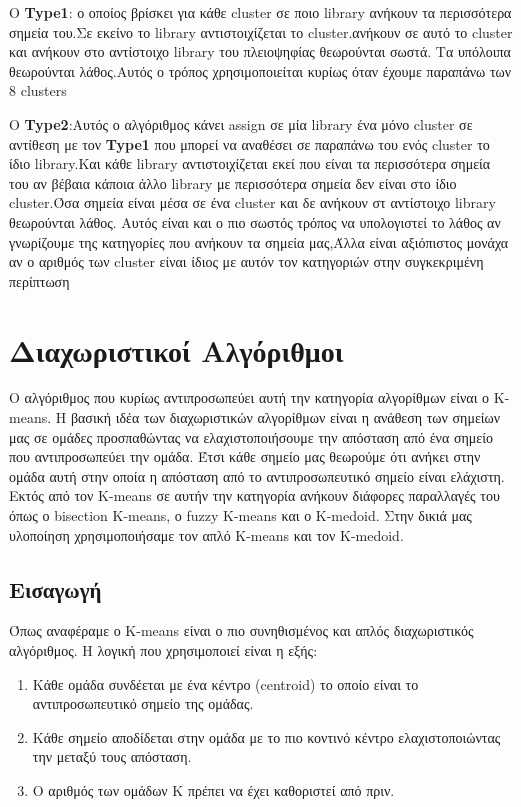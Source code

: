 Ο \textbf{Type1}: ο οποίος βρίσκει για  κάθε cluster σε ποιο
library ανήκουν τα περισσότερα σημεία του.Σε εκείνο το library αντιστοιχίζεται το 
cluster.ανήκουν σε αυτό το cluster και ανήκουν στο αντίστοιχο library του πλειοψηφίας 
θεωρούνται σωστά. Τα υπόλοιπα θεωρούνται λάθος.Αυτός ο τρόπος
χρησιμοποιείται κυρίως όταν έχουμε παραπάνω των 8 clusters 


Ο \textbf{Type2}:Αυτός ο αλγόριθμος κάνει 
assign σε μία library ένα μόνο  cluster σε αντίθεση
με τον \textbf{Type1} που μπορεί να αναθέσει σε παραπάνω του ενός
cluster το ίδιο library.Και κάθε library αντιστοιχίζεται εκεί που 
είναι τα περισσότερα σημεία του αν βέβαια κάποια άλλο library με περισσότερα σημεία
δεν είναι στο ίδιο cluster.Όσα σημεία είναι μέσα σε ένα cluster και δε ανήκουν
στ αντίστοιχο library θεωρούνται λάθος. Αυτός είναι και ο πιο σωστός τρόπος
να υπολογιστεί το λάθος αν γνωρίζουμε της κατηγορίες που ανήκουν τα σημεία μας,Άλλα είναι
αξιόπιστος  μονάχα αν ο αριθμός των cluster είναι ίδιος με αυτόν τον κατηγοριών
στην συγκεκριμένη περίπτωση

\section{Διαχωριστικοί Αλγόριθμοι}
Ο αλγόριθμος που κυρίως αντιπροσωπεύει αυτή την κατηγορία αλγορίθμων είναι ο K-means. Η βασική ιδέα των διαχωριστικών αλγορίθμων είναι η ανάθεση των σημείων μας σε ομάδες προσπαθώντας να ελαχιστοποιήσουμε την απόσταση από ένα σημείο που αντιπροσωπεύει την ομάδα. Έτσι κάθε σημείο μας θεωρούμε ότι ανήκει στην ομάδα αυτή στην οποία η απόσταση από το αντιπροσωπευτικό σημείο είναι ελάχιστη. Εκτός από τον K-means σε αυτήν την κατηγορία ανήκουν διάφορες παραλλαγές του όπως ο bisection K-means, ο fuzzy Κ-means και ο K-medoid. Στην δικιά μας υλοποίηση χρησιμοποιήσαμε τον απλό K-means και τον K-medoid.

\subsection{Εισαγωγή}
Όπως αναφέραμε ο K-means είναι ο πιο συνηθισμένος και απλός διαχωριστικός αλγόριθμος. Η λογική που χρησιμοποιεί είναι η εξής:
\begin{enumerate}
    \item Κάθε ομάδα συνδέεται με ένα κέντρο (centroid) το οποίο είναι το αντιπροσωπευτικό σημείο της ομάδας.
    \item Κάθε σημείο αποδίδεται στην ομάδα με το πιο κοντινό κέντρο ελαχιστοποιώντας την μεταξύ τους απόσταση.
    \item Ο αριθμός των ομάδων Κ πρέπει να έχει καθοριστεί από πριν.
\end{enumerate}

